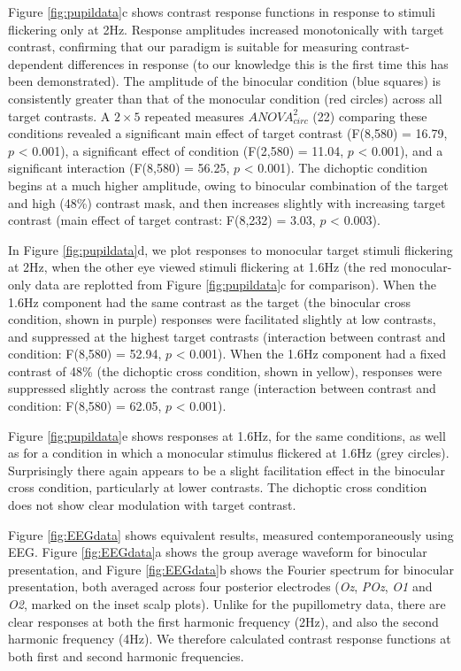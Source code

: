 \documentclass[
]{article}
\begin{document}
Figure \ref{fig:pupildata}c shows contrast response functions in response to stimuli flickering only at 2Hz. Response amplitudes increased monotonically with target contrast, confirming that our paradigm is suitable for measuring contrast-dependent differences in response (to our knowledge this is the first time this has been demonstrated). The amplitude of the binocular condition (blue squares) is consistently greater than that of the monocular condition (red circles) across all target contrasts. A \(2\times5\) repeated measures \(ANOVA^2_{circ}\) (22) comparing these conditions revealed a significant main effect of target contrast (F(8,580) = 16.79, \(p\) \textless{} 0.001), a significant effect of condition (F(2,580) = 11.04, \(p\) \textless{} 0.001), and a significant interaction (F(8,580) = 56.25, \(p\) \textless{} 0.001). The dichoptic condition begins at a much higher amplitude, owing to binocular combination of the target and high (48\%) contrast mask, and then increases slightly with increasing target contrast (main effect of target contrast: F(8,232) = 3.03, \(p\) \textless{} 0.003).

In Figure \ref{fig:pupildata}d, we plot responses to monocular target stimuli flickering at 2Hz, when the other eye viewed stimuli flickering at 1.6Hz (the red monocular-only data are replotted from Figure \ref{fig:pupildata}c for comparison). When the 1.6Hz component had the same contrast as the target (the binocular cross condition, shown in purple) responses were facilitated slightly at low contrasts, and suppressed at the highest target contrasts (interaction between contrast and condition: F(8,580) = 52.94, \(p\) \textless{} 0.001). When the 1.6Hz component had a fixed contrast of 48\% (the dichoptic cross condition, shown in yellow), responses were suppressed slightly across the contrast range (interaction between contrast and condition: F(8,580) = 62.05, \(p\) \textless{} 0.001).

Figure \ref{fig:pupildata}e shows responses at 1.6Hz, for the same conditions, as well as for a condition in which a monocular stimulus flickered at 1.6Hz (grey circles). Surprisingly there again appears to be a slight facilitation effect in the binocular cross condition, particularly at lower contrasts. The dichoptic cross condition does not show clear modulation with target contrast.

Figure \ref{fig:EEGdata} shows equivalent results, measured contemporaneously using EEG. Figure \ref{fig:EEGdata}a shows the group average waveform for binocular presentation, and Figure \ref{fig:EEGdata}b shows the Fourier spectrum for binocular presentation, both averaged across four posterior electrodes (\emph{Oz}, \emph{POz}, \emph{O1} and \emph{O2}, marked on the inset scalp plots). Unlike for the pupillometry data, there are clear responses at both the first harmonic frequency (2Hz), and also the second harmonic frequency (4Hz). We therefore calculated contrast response functions at both first and second harmonic frequencies.
\end{document}
